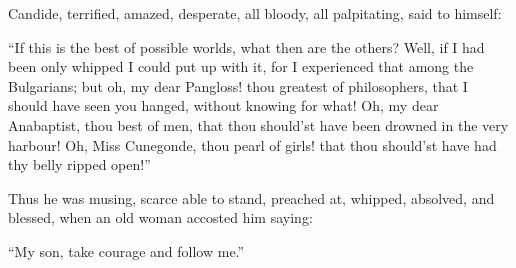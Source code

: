 Candide, terrified, amazed, desperate, all bloody, all palpitating, said to himself:

``If this is the best of possible worlds, what then are the others? Well, if I had been only whipped I could put up with it, for I experienced that among the Bulgarians; but oh, my dear Pangloss! thou greatest of philosophers, that I should have seen you hanged, without knowing for what! Oh, my dear Anabaptist, thou best of men, that thou should'st have been drowned in the very harbour! Oh, Miss Cunegonde, thou pearl of girls! that thou should'st have had thy belly ripped open!''

Thus he was musing, scarce able to stand, preached at, whipped, absolved, and blessed, when an old woman accosted him saying:

``My son, take courage and follow me.''

